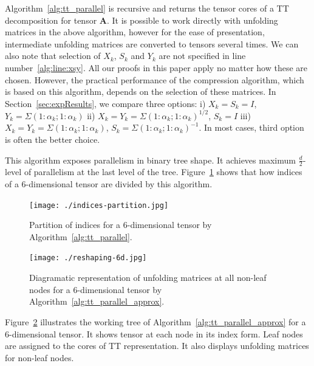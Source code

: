 \documentclass[runningheads]{llncs}
\newcommand{\tensor}[1]{\cal\textbf{#1}\xspace}
\begin{document}
Algorithm~\ref{alg:tt_parallel} is recursive and returns the tensor cores of a TT decomposition for tensor \tensor{A}. It is possible to work directly with unfolding matrices in the above algorithm, however for the ease of presentation, intermediate unfolding matrices are converted to tensors several times. We can also note that selection of $X_k$, $S_k$ and $Y_k$ are not specified in line number~\ref{alg:line:xsy}. All our proofs in this paper apply no matter how these are chosen. However, the practical performance of the compression algorithm, which is based on this algorithm, depends on the selection of these matrices. In Section~\ref{sec:expResults}, we compare three options: i) $X_k=S_k=I$, $Y_k = \Sigma(1:\alpha_k; 1:\alpha_k)$ ii) $X_k = Y_k = \Sigma(1:\alpha_k; 1:\alpha_k)^{1/2}$, $S_k = I$ iii) $X_k = Y_k = \Sigma(1:\alpha_k; 1:\alpha_k)$, $S_k = \Sigma(1:\alpha_k; 1:\alpha_k)^{-1} $. In most cases, third option is often the better choice.

This algorithm exposes parallelism in binary tree shape. It achieves maximum $\frac{d}{2}$-level of parallelism at the last level of the tree. Figure~\ref{fig:4dindices} shows that how indices of a $6$-dimensional tensor are divided by this algorithm.


\begin{figure}[htb]
	\begin{center}
		\texttt{[image: ./indices-partition.jpg]}
	\end{center}
	\caption{\label{fig:4dindices} Partition of indices for a $6$-dimensional tensor by Algorithm~\ref{alg:tt_parallel}.} 
\end{figure}


\begin{figure}[htb]
	\begin{center}
		\texttt{[image: ./reshaping-6d.jpg]}
	\end{center}
	\caption{Diagramatic representation of unfolding matrices at all non-leaf nodes for a $6$-dimensional tensor by Algorithm~\ref{alg:tt_parallel_approx}.\label{fig:ptt:reshaping}}
\end{figure}

\noindent Figure~\ref{fig:ptt:reshaping} illustrates the working tree of Algorithm~\ref{alg:tt_parallel_approx} for a $6$-dimensional tensor. It shows tensor at each node in its index form. Leaf nodes are assigned to the cores of TT representation. It also displays unfolding matrices for non-leaf nodes.
\end{document}

